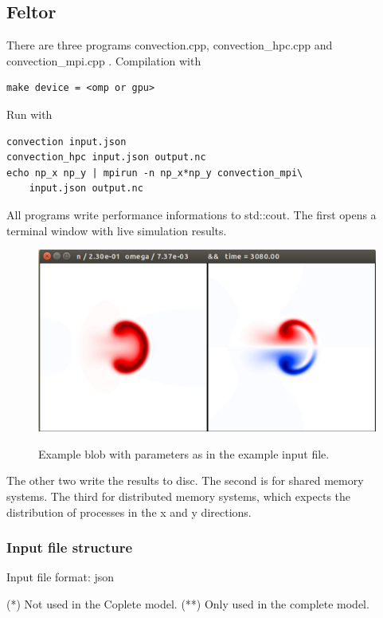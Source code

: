 \documentclass{hitec} %
\begin{document}
\subsection{Feltor}
There are three programs convection.cpp, convection\_hpc.cpp and convection\_mpi.cpp . Compilation with
\begin{verbatim}
make device = <omp or gpu>
\end{verbatim}
Run with
\begin{verbatim}
convection input.json
convection_hpc input.json output.nc
echo np_x np_y | mpirun -n np_x*np_y convection_mpi\
    input.json output.nc
\end{verbatim}
All programs write performance informations to std::cout.
The first opens a terminal window with live simulation results.
\begin{figure}[htpb]
\centering
\includegraphics[trim = 0px 0px 0px 0px, clip, scale=0.4]{./blob}\label{fig:example}
\caption{
  Example blob with parameters as in the example input file.
}
\end{figure}
The other two write the results to disc.
The second is for shared memory systems. The third for distributed
memory systems, which expects the distribution of processes in the
x and y directions.

\subsubsection{Input file structure}
Input file format: json

(*) Not used in the Coplete model.
(**) Only used in the complete model.
\end{document}
